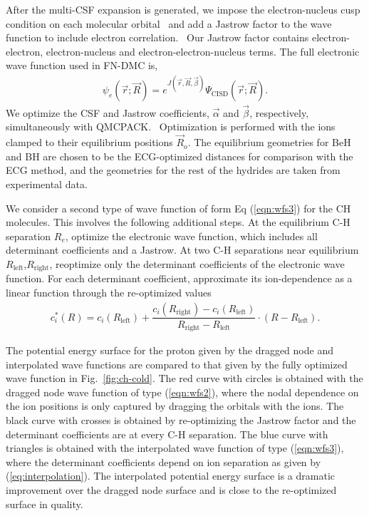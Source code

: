 \documentclass[aip,jcp,numerical,reprint]{revtex4-1}
\begin{document}
After the multi-CSF expansion is generated, we impose the electron-nucleus cusp condition on each molecular orbital~\cite{cusp} and add a Jastrow factor to the wave function to include electron correlation.~\cite{Kato} Our Jastrow factor contains electron-electron, electron-nucleus and electron-electron-nucleus terms. The full electronic wave function used in FN-DMC is,
\begin{align}
\psi_e(\vec{r};\vec{R})=e^{J(\vec{r},\vec{R},\vec{\beta})}\Psi_{\text{CISD}}(\vec{r};\vec{R})\label{eq:psie}.
\end{align}
We optimize the CSF and Jastrow coefficients, $\vec{\alpha}$ and $\vec{\beta}$, respectively, simultaneously with QMCPACK.~\cite{QMCPACK_Kim,QMCPACK_Esler} Optimization is performed with the ions clamped to their equilibrium positions $\vec{R}_o$. The equilibrium geometries for BeH and BH are chosen to be the ECG-optimized distances for comparison with the ECG  method, and the geometries for the rest of the hydrides are taken from experimental data.

We consider a second type of wave function of form Eq (\ref{eqn:wfs3}) for the CH molecules.  This involves the following additional steps. At the equilibrium C-H separation $R_e$, optimize the electronic wave function, which includes all determinant coefficients and a Jastrow. At two C-H separations near equilibrium $R_{\text{left}}$,$R_{\text{right}}$, reoptimize only the determinant coefficients of the electronic wave function. For each determinant coefficient, approximate its ion-dependence as a linear function through the re-optimized values
\begin{align}
c_i^*(R) = c_i(R_{\text{left}}) + 
\dfrac{c_i(R_{\text{right}}) - c_i(R_{\text{left}})}{R_{\text{right}}-R_{\text{left}}}\cdot(R-R_{\text{left}}). \label{eq:interpolation}
\end{align}

The potential energy surface for the proton given by the dragged node and interpolated wave functions are compared to that given by the fully optimized wave function in Fig.~\ref{fig:ch-cold}. The red curve with circles is obtained with the dragged node wave function of type (\ref{eqn:wfs2}), where the nodal dependence on the ion positions is only captured by dragging the orbitals with the ions. The black curve with crosses is obtained by re-optimizing the Jastrow factor and the determinant coefficients are at every C-H separation. The blue curve with triangles is obtained with the interpolated wave function of type (\ref{eqn:wfs3}), where the determinant coefficients depend on ion separation as given by (\ref{eq:interpolation}). The interpolated potential energy surface is a dramatic improvement over the dragged node surface and is close to the re-optimized surface in quality. 
\end{document}
